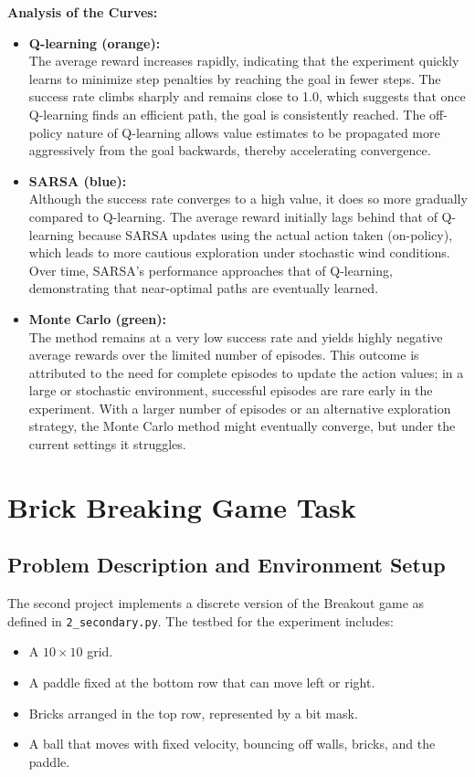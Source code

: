 \documentclass{article}
\begin{document}
\noindent\textbf{Analysis of the Curves:}
\begin{itemize}
    \item \textbf{Q-learning (orange):} \\
          The average reward increases rapidly, indicating that the experiment quickly learns to minimize step penalties by reaching the goal in fewer steps. The success rate climbs sharply and remains close to 1.0, which suggests that once Q-learning finds an efficient path, the goal is consistently reached. The off-policy nature of Q-learning allows value estimates to be propagated more aggressively from the goal backwards, thereby accelerating convergence.
    \item \textbf{SARSA (blue):} \\
          Although the success rate converges to a high value, it does so more gradually compared to Q-learning. The average reward initially lags behind that of Q-learning because SARSA updates using the actual action taken (on-policy), which leads to more cautious exploration under stochastic wind conditions. Over time, SARSA's performance approaches that of Q-learning, demonstrating that near-optimal paths are eventually learned.
    \item \textbf{Monte Carlo (green):} \\
          The method remains at a very low success rate and yields highly negative average rewards over the limited number of episodes. This outcome is attributed to the need for complete episodes to update the action values; in a large or stochastic environment, successful episodes are rare early in the experiment. With a larger number of episodes or an alternative exploration strategy, the Monte Carlo method might eventually converge, but under the current settings it struggles.
\end{itemize}

\section{Brick Breaking Game Task}
\subsection{Problem Description and Environment Setup}
The second project implements a discrete version of the Breakout game as defined in \texttt{2\_secondary.py}. The testbed for the experiment includes:
\begin{itemize}
    \item A $10 \times 10$ grid.
    \item A paddle fixed at the bottom row that can move left or right.
    \item Bricks arranged in the top row, represented by a bit mask.
    \item A ball that moves with fixed velocity, bouncing off walls, bricks, and the paddle.
\end{itemize}
\end{document}
